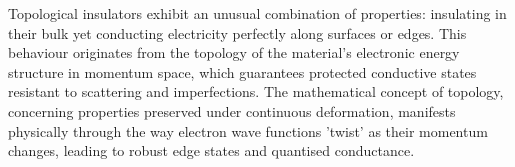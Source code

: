 Topological insulators exhibit an unusual combination of properties: insulating in their bulk yet conducting electricity perfectly along surfaces or edges. This behaviour originates from the topology of the material's electronic energy structure in momentum space, which guarantees protected conductive states resistant to scattering and imperfections. The mathematical concept of topology, concerning properties preserved under continuous deformation, manifests physically through the way electron wave functions 'twist' as their momentum changes, leading to robust edge states and quantised conductance.